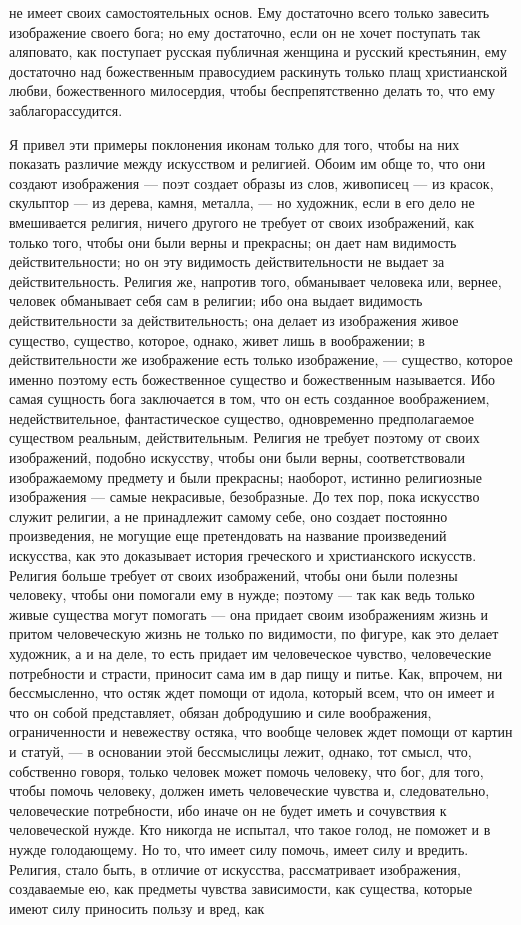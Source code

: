 \documentclass[12pt]{article}
\begin{document}
не имеет своих самостоятельных основ. Ему достаточно всего только завесить изображение своего бога; но ему достаточно, если он не хочет поступать так аляповато, как поступает русская публичная женщина и русский крестьянин, ему достаточно над божественным правосудием раскинуть только плащ христианской любви, божественного милосердия, чтобы беспрепятственно делать то, что ему заблагорассудится. 

Я привел эти примеры поклонения иконам только для того, чтобы на них показать различие между искусством и религией. Обоим им обще то, что они создают изображения --- поэт создает образы из слов, живописец --- из красок, скульптор --- из дерева, камня, металла, --- но художник, если в его дело не вмешивается религия, ничего другого не требует от своих изображений, как только того, чтобы они были верны и прекрасны; он дает нам видимость действительности; но он эту видимость действительности не выдает за действительность. Религия же, напротив того, обманывает человека или, вернее, человек обманывает себя сам в религии; ибо она выдает видимость действительности за действительность; она делает из изображения живое существо, существо, которое, однако, живет лишь в воображении; в действительности же изображение есть только изображение, --- существо, которое именно поэтому есть божественное существо и божественным называется. Ибо самая сущность бога заключается в том, что он есть созданное воображением, недействительное, фантастическое существо, одновременно предполагаемое существом реальным, действительным. Религия не требует поэтому от своих изображений, подобно искусству, чтобы они были верны, соответствовали изображаемому предмету и были прекрасны; наоборот, истинно религиозные изображения --- самые некрасивые, безобразные. До тех пор, пока искусство служит религии, а не принадлежит самому себе, оно создает постоянно произведения, не могущие еще претендовать на название произведений искусства, как это доказывает история греческого и христианского искусств. Религия больше требует от своих изображений, чтобы они были полезны человеку, чтобы они помогали ему в нужде; поэтому --- так как ведь только живые существа могут помогать --- она придает своим изображениям жизнь и притом человеческую жизнь не только по видимости, по фигуре, как это делает художник, а и на деле, то есть придает им человеческое чувство, человеческие потребности и страсти, приносит сама им в дар пищу и питье. Как, впрочем, ни бессмысленно, что остяк ждет помощи от идола, который всем, что он имеет и что он собой представляет, обязан добродушию и силе воображения, ограниченности и невежеству остяка, что вообще человек ждет помощи от картин и статуй, --- в основании этой бессмыслицы лежит, однако, тот смысл, что, собственно говоря, только человек может помочь человеку, что бог, для того, чтобы помочь человеку, должен иметь человеческие чувства и, следовательно, человеческие потребности, ибо иначе он не будет иметь и сочувствия к человеческой нужде. Кто никогда не испытал, что такое голод, не поможет и в нужде голодающему. Но то, что имеет силу помочь, имеет силу и вредить. Религия, стало быть, в отличие от искусства, рассматривает изображения, создаваемые ею, как предметы чувства зависимости, как существа, которые имеют силу приносить пользу и вред, как 
\end{document}
